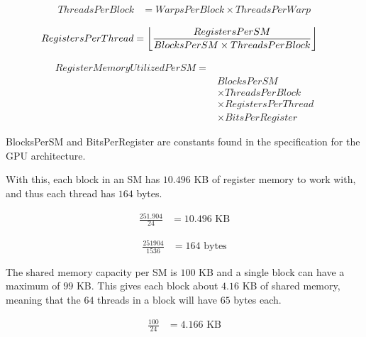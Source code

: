 \begin{equation}
\begin{split}
  ThreadsPerBlock &= WarpsPerBlock \times ThreadsPerWarp
\end{split}
\end{equation}

\begin{equation}
\begin{split}
  RegistersPerThread &= \floor*{\frac{RegistersPerSM}{BlocksPerSM \times ThreadsPerBlock}}
\end{split}
\end{equation}

\begin{equation} \label{eq:reg_mem_utilized_per_sm}
\begin{split}
  RegisterMemoryUtilizedPerSM =\\
  &BlocksPerSM\\
  &\times ThreadsPerBlock\\
  &\times RegistersPerThread\\
  &\times BitsPerRegister
\end{split}
\end{equation}

BlocksPerSM and BitsPerRegister are constants found in the specification for the GPU architecture.

With this, each block in an SM has $10.496$ KB of register memory to work with, and thus each thread has $164$ bytes.

\begin{equation}
\begin{split}
  \frac{251.904}{24} &= 10.496 \text{ KB}
\end{split}
\end{equation}

\begin{equation}
\begin{split}
  \frac{251904}{1536} &= 164 \text{ bytes}
\end{split}
\end{equation}

The shared memory capacity per SM is $100$ KB and a single block can have a maximum of $99$ KB. This gives each block about $4.16$ KB of shared memory, meaning that the $64$ threads in a block will have $65$ bytes each.

\begin{equation}
\begin{split}
  \frac{100}{24} &= 4.166 \text{ KB}
\end{split}
\end{equation}

